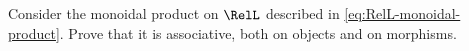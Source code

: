 
\begin{exercise}
    \label{ex:relassocstack}
    Consider the monoidal product on $\RelL$ described in \cref{eq:RelL-monoidal-product}.
    Prove that it is associative, both on objects and on morphisms.
\end{exercise}

